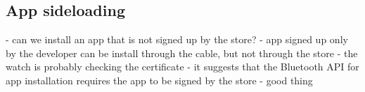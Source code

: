 \subsection{App sideloading}
- can we install an app that is not signed up by the store?
- app signed up only by the developer can be install through the cable, but not through the store
- the watch is probably checking the certificate
- it suggests that the Bluetooth API for app installation requires the app to be signed by the store - good thing
